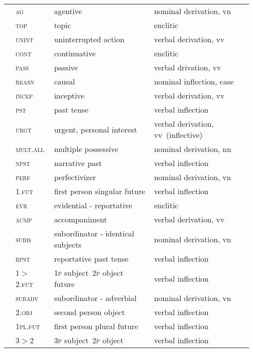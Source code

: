 \begin{refsection}
\begin{small}
\begin{longtable}{*{4}{@{\hspace{0.75ex}}l}@{\hspace{0ex}}}
		& \textsc{ag} 		& agentive 	& nominal derivation, vn\\
		& \textsc{top} 		& topic 	& enclitic\\
		& \textsc{unint} 	& uninterrupted action 	& verbal derivation, vv\\
		& \textsc{cont} 		& continuative 	& enclitic\\
		& \textsc{pass} 		& passive 	& verbal drivation, vv\\
 		& \textsc{reasn} 	& causal 	& nominal inflection, case\\
	& \textsc{incep} & inceptive 	& verbal derivation, vv\\
		& \textsc{pst} 		& past tense 	& verbal inflection\\
		& \textsc{urgt} 	& urgent, personal interest 	& verbal derivation, vv~(inflective)\\
 		& \textsc{mult.all} 	& multiple possessive 	& nominal derivation, nn\\
 	& \textsc{npst} 	& narrative past 	& verbal inflection\\
 	& \textsc{perf} 	& perfectivizer 	& nominal derivation, vn \\
 		& 1.\textsc{fut} 	& first person singular future 	& verbal inflection\\
		& \textsc{evr} 		& evidential - reportative 	& enclitic\\
		& \textsc{acmp}		& accompaniment 	& verbal derivation, vv\\
		& \textsc{subis} 	& subordinator - identical subjects 	& nominal derivation, vn\\
		& \textsc{rpst} 	& reportative past tense 	& verbal inflection\\
	& 1$>$2.\textsc{fut} 	& 1\textsc{p} subject~2\textsc{p} object future 	& verbal inflection\\
		& \textsc{subadv} 	& subordinator - adverbial 	& nominal derivation, vn\\
		& 2.\textsc{obj} 	& second person object 	& verbal inflection\\
		& 1\textsc{pl.fut} 	& first person plural future 	& verbal inflection\\
		& 3$>$2 		&  3\textsc{p} subject~2\textsc{p} object 	& verbal inflection\\

\end{longtable}
\end{small}
\end{refsection}
